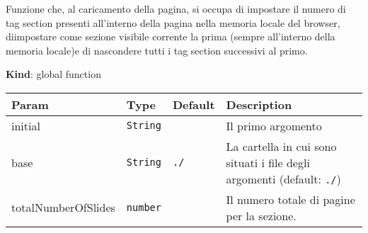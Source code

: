 Funzione che, al caricamento della pagina, si occupa di impostare il
numero di tag section presenti all'interno della pagina nella memoria
locale del browser, diimpostare come sezione visibile corrente la prima
(sempre all'interno della memoria locale)e di nascondere tutti i tag
section successivi al primo.

\textbf{Kind}: global function

\begin{tabularx}{\textwidth}{XXXX}
\toprule
\begin{minipage}[b]{0.22\columnwidth}\raggedright
Param\strut
\end{minipage} & \begin{minipage}[b]{0.22\columnwidth}\raggedright
Type\strut
\end{minipage} & \begin{minipage}[b]{0.22\columnwidth}\raggedright
Default\strut
\end{minipage} & \begin{minipage}[b]{0.22\columnwidth}\raggedright
Description\strut
\end{minipage}\tabularnewline
\midrule
\endhead
\begin{minipage}[t]{0.22\columnwidth}\raggedright
initial\strut
\end{minipage} & \begin{minipage}[t]{0.22\columnwidth}\raggedright
\texttt{String}\strut
\end{minipage} & \begin{minipage}[t]{0.22\columnwidth}\raggedright
\strut
\end{minipage} & \begin{minipage}[t]{0.22\columnwidth}\raggedright
Il primo argomento\strut
\end{minipage}\tabularnewline
\begin{minipage}[t]{0.22\columnwidth}\raggedright
base\strut
\end{minipage} & \begin{minipage}[t]{0.22\columnwidth}\raggedright
\texttt{String}\strut
\end{minipage} & \begin{minipage}[t]{0.22\columnwidth}\raggedright
\texttt{./}\strut
\end{minipage} & \begin{minipage}[t]{0.22\columnwidth}\raggedright
La cartella in cui sono situati i file degli argomenti (default:
\texttt{./})\strut
\end{minipage}\tabularnewline
\begin{minipage}[t]{0.22\columnwidth}\raggedright
totalNumberOfSlides\strut
\end{minipage} & \begin{minipage}[t]{0.22\columnwidth}\raggedright
\texttt{number}\strut
\end{minipage} & \begin{minipage}[t]{0.22\columnwidth}\raggedright
\strut
\end{minipage} & \begin{minipage}[t]{0.22\columnwidth}\raggedright
Il numero totale di pagine per la sezione.\strut
\end{minipage}\tabularnewline
\bottomrule
\end{tabularx}

